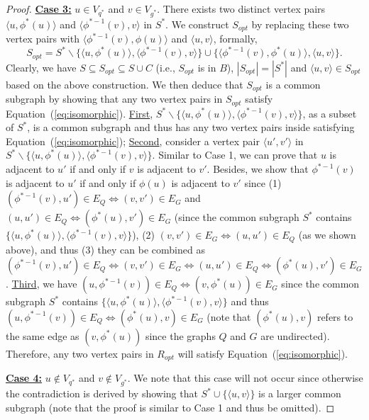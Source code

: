 \begin{proof}
    \smallskip
    \noindent\underline{\textbf{Case 3:}} $u\in V_{q^*}$ and $v\in V_{g^*}$. There exists two distinct vertex pairs $\langle u,\phi^*(u) \rangle$ and $\langle \phi^{*-1}(v),v \rangle$ in $S^*$. We construct $S_{opt}$ by replacing these two vertex pairs with $\langle \phi^{*-1}(v),\phi(u) \rangle$ and $\langle u,v \rangle$, formally,
    \begin{equation}
        S_{opt}\!\!=\!\!S^*\backslash\{\langle u,\phi^*(u) \rangle,\!\langle\phi^{*-1}(v),v \rangle\}\!\cup\!\{\langle \phi^{*-1}(v),\phi^*(u) \rangle,\!\langle u,v \rangle\}.
    \end{equation}
    Clearly, we have $S\subseteq S_{opt}\subseteq S\cup C$ (i.e., $S_{opt}$ is in $B$), $|S_{opt}|=|S^*|$ and $\langle u,v \rangle\in S_{opt}$ based on the above construction. We then deduce that $S_{opt}$ is a common subgraph  by showing that any two vertex pairs in $S_{opt}$ satisfy Equation~(\ref{eq:isomorphic}).
    \underline{First}, $S^*\backslash\{\langle u,\phi^*(u) \rangle,\langle \phi^{*-1}(v),v\rangle\}$, as a subset of $S^*$, is a common subgraph and thus has any two vertex pairs inside satisfying Equation~(\ref{eq:isomorphic});
    \underline{Second}, consider a vertex pair $\langle u',v' \rangle$ in $S^*\backslash\{\langle u,\phi^*(u) \rangle,\langle \phi^{*-1}(v),v\rangle\}$. Similar to Case 1, we can prove that $u$ is adjacent to $u'$ if and only if $v$ is adjacent to $v'$. Besides, we show that $\phi^{*-1}(v)$ is adjacent to $u'$ if and only if $\phi(u)$ is adjacent to $v'$ since (1) $(\phi^{*-1}(v),u')\in E_Q\Leftrightarrow (v,v')\in E_G$ and $(u,u')\in E_Q\Leftrightarrow (\phi^*(u),v')\in E_G$ (since the common subgraph $S^*$ contains $\{\langle u,\phi^*(u) \rangle,\langle \phi^{*-1}(v),v\rangle\}$), (2) $ (v,v')\in E_G \Leftrightarrow (u,u')\in E_Q$ (as we shown above), and thus (3) they can be combined as $(\phi^{*-1}(v),u')\in E_Q\Leftrightarrow (v,v')\in E_G \Leftrightarrow (u,u')\in E_Q \Leftrightarrow (\phi^*(u),v')\in E_G$.
    \underline{Third}, we have $(u,\phi^{*-1}(v))\in E_Q\Leftrightarrow (v,\phi^*(u))\in E_G$ since the common subgraph $S^*$ contains $\{\langle u,\phi^*(u) \rangle,\langle \phi^{*-1}(v),v\rangle\}$ and thus $(u,\phi^{*-1}(v))\in E_Q\Leftrightarrow (\phi^*(u),v)\in E_G$ (note that $(\phi^*(u),v)$ refers to the same edge as $(v,\phi^*(u))$ since the graphs $Q$ and $G$ are undirected). Therefore, any two vertex pairs in $R_{opt}$ will satisfy Equation~(\ref{eq:isomorphic}).

    \smallskip
    \noindent\underline{\textbf{Case 4:}} $u\notin V_{q^*}$ and $v\notin V_{g^*}$. We note that this case will not occur since otherwise the contradiction is derived by showing that $S^*\cup \{\langle u,v\rangle\}$ is a larger common subgraph (note that the proof is similar to Case 1 and thus be omitted).
    \fi
\end{proof}

